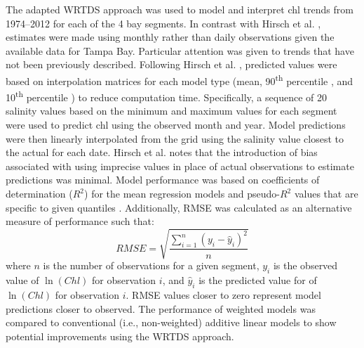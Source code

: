 \documentclass{svjour3}\usepackage[]{graphicx}\usepackage[]{color}
\newcommand{\nine}{90\textsuperscript{th} percentile }
\newcommand{\ten}{10\textsuperscript{th} percentile }
\begin{document}
The adapted \ac{WRTDS} approach was used to model and interpret \ac{chl} trends from 1974--2012 for each of the 4 bay segments.  In contrast with Hirsch et al. \cite{Hirsch10}, estimates were made using monthly rather than daily observations given the available data for Tampa Bay.  Particular attention was given to trends that have not been previously described.  Following Hirsch et al. \cite{Hirsch10}, predicted values were based on interpolation matrices for each model type (mean, \nine, and \ten) to reduce computation time.  Specifically, a sequence of 20 salinity values based on the minimum and maximum values for each segment were used to predict \ac{chl} using the observed month and year.  Model predictions were then linearly interpolated from the grid using the salinity value closest to the actual for each date.  Hirsch et al. \cite{Hirsch10} notes that the introduction of bias associated with using imprecise values in place of actual observations to estimate predictions was minimal.  Model performance was based on coefficients of determination ($R^2$) for the mean regression models and pseudo-$R^2$ values that are specific to given quantiles \cite{Koenker99}.  Additionally, \ac{RMSE} was calculated as an alternative measure of performance such that:
\begin{equation}
RMSE = \sqrt {{\frac{{\sum\limits_{{i = 1}}^n {{{\left( {{y_i} - {{\hat{y}}_i}} \right)}^2}} }}{{n}}}}
\end{equation}
\noindent where $n$ is the number of observations for a given segment, $y_i$ is the observed value of $\ln\left(Chl\right)$ for observation $i$, and ${\hat{y}}_i$ is the predicted value for of $\ln\left(Chl\right)$ for observation $i$.  \ac{RMSE} values closer to zero represent model predictions closer to observed. The performance of weighted models was compared to conventional (i.e., non-weighted) additive linear models to show potential improvements using the \ac{WRTDS} approach.   
\end{document}
